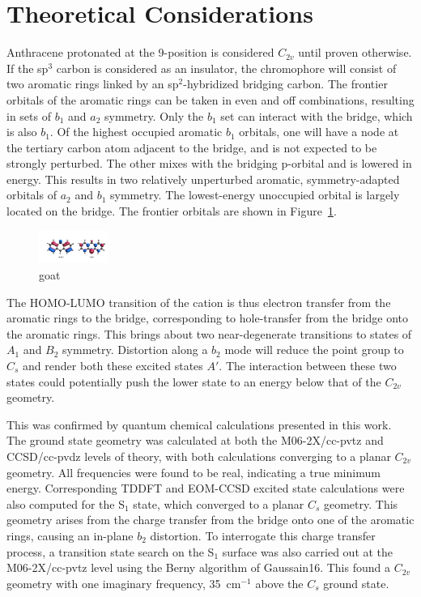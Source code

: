 \documentclass[journal=jpcafh,manuscript=article,layout=onecolumn, 12pt]{achemso}
\begin{document}
\section{Theoretical Considerations}
Anthracene protonated at the 9-position is considered $C_{2v}$ until proven otherwise. If the sp$^3$ carbon is considered as an insulator, the chromophore will consist of two aromatic rings linked by an sp$^2$-hybridized bridging carbon. The frontier orbitals of the aromatic rings can be taken in even and off combinations, resulting in sets of $b_1$ and $a_2$ symmetry. Only the $b_1$ set can interact with the bridge, which is also $b_1$. Of the highest occupied aromatic $b_1$ orbitals, one will have a node at the tertiary carbon atom adjacent to the bridge, and is not expected to be strongly perturbed. The other mixes with the bridging p-orbital and is lowered in energy. This results in two relatively unperturbed aromatic, symmetry-adapted orbitals of $a_2$ and $b_1$ symmetry. The lowest-energy unoccupied orbital is largely located on the bridge. The frontier orbitals are shown in Figure~\ref{Fig:1}.

\begin{figure} [h]
	\includegraphics[width=0.2\textwidth]{figures/Figure1}
	\caption{goat}
	\label{Fig:1}
\end{figure}

The HOMO-LUMO transition of the cation is thus electron transfer from the aromatic rings to the bridge, corresponding to hole-transfer from the bridge onto the aromatic rings. This brings about two near-degenerate transitions to states of $A_1$ and $B_2$ symmetry. Distortion along a $b_2$ mode will reduce the point group to $C_s$ and render both these excited states $A'$. The interaction between these two states could potentially push the lower state to an energy below that of the $C_{2v}$ geometry.

This was confirmed by quantum chemical calculations presented in this work. The ground state geometry was calculated at both the M06-2X/cc-pvtz and CCSD/cc-pvdz levels of theory, with both calculations converging to a planar $C_{2v}$ geometry. All frequencies were found to be real, indicating a true minimum energy. Corresponding TDDFT and EOM-CCSD excited state calculations were also computed for the S$_1$ state, which converged to a planar $C_s$ geometry. This geometry arises from the charge transfer from the bridge onto one of the aromatic rings, causing an in-plane $b_2$ distortion. To interrogate this charge transfer process, a transition state search on the S$_1$ surface was also carried out at the M06-2X/cc-pvtz level using the Berny algorithm of Gaussain16. This found a $C_{2v}$ geometry with one imaginary frequency, 35~cm$^{-1}$ above the $C_s$ ground state.
\end{document}
